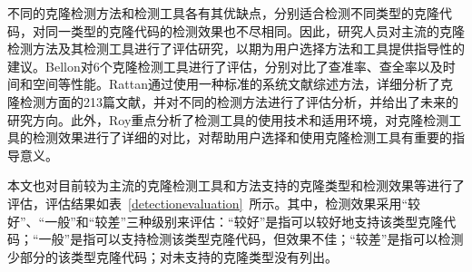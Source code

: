 不同的克隆检测方法和检测工具各有其优缺点，分别适合检测不同类型的克隆代码，对同一类型的克隆代码的检测效果也不尽相同。因此，研究人员对主流的克隆检测方法及其检测工具进行了评估研究，以期为用户选择方法和工具提供指导性的建议\cite{bellon2007comparison}\cite{rattan2013software}\cite{roy2009comparison}\cite{svajlenko2014evaluating}。Bellon对6个克隆检测工具进行了评估，分别对比了查准率、查全率以及时间和空间等性能\cite{bellon2007comparison}。Rattan通过使用一种标准的系统文献综述方法，详细分析了克隆检测方面的213篇文献，并对不同的检测方法进行了评估分析，并给出了未来的研究方向\cite{rattan2013software}。此外，Roy重点分析了检测工具的使用技术和适用环境，对克隆检测工具的检测效果进行了详细的对比，对帮助用户选择和使用克隆检测工具有重要的指导意义\cite{roy2009comparison}\cite{svajlenko2014evaluating}。

本文也对目前较为主流的克隆检测工具和方法支持的克隆类型和检测效果等进行了评估，评估结果如表~\ref{detectionevaluation}~所示。其中，检测效果采用“较好”、“一般”和“较差”三种级别来评估：“较好”是指可以较好地支持该类型克隆代码；“一般”是指可以支持检测该类型克隆代码，但效果不佳；“较差”是指可以检测少部分的该类型克隆代码；对未支持的克隆类型没有列出。

